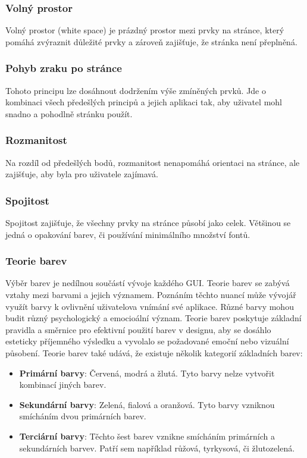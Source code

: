 \subsubsection*{Volný prostor}
Volný prostor (white space) je prázdný prostor mezi prvky na stránce, který pomáhá zvýraznit důležité prvky a zároveň zajišťuje, že stránka není přeplněná.

\subsubsection*{Pohyb zraku po stránce}
Tohoto principu lze dosáhnout dodržením výše zmíněných prvků. Jde o kombinaci všech předešlých principů a jejich aplikaci tak, aby uživatel mohl snadno a pohodlně stránku použít.

\subsubsection*{Rozmanitost}
Na rozdíl od předešlých bodů, rozmanitost nenapomáhá orientaci na stránce, ale zajišťuje, aby byla pro uživatele zajímavá.

\subsubsection*{Spojitost}
Spojitost zajišťuje, že všechny prvky na stránce působí jako celek. Většinou se jedná o opakování barev, či používání minimálního množství fontů.

\subsubsection{Teorie barev}
Výběr barev je nedílnou součástí vývoje každého GUI. Teorie barev se zabývá vztahy mezi barvami a jejich významem. Poznáním těchto nuancí může vývojář využít barvy k ovlivnění uživatelova vnímání své aplikace. Různé barvy mohou budit různý psychologický a emocioální význam. Teorie barev poskytuje základní pravidla a směrnice pro efektivní použití barev v designu, aby se dosáhlo esteticky příjemného výsledku a vyvolalo se požadované emoční nebo vizuální působení. Teorie barev také udává, že existuje několik kategorií základních barev:
\begin{itemize}
    \item \textbf{Primární barvy}: Červená, modrá a žlutá. Tyto barvy nelze vytvořit kombinací jiných barev.
    \item \textbf{Sekundární barvy}: Zelená, fialová a oranžová. Tyto barvy vzniknou smícháním dvou primárních barev.
    \item \textbf{Terciární barvy}: Těchto šest barev vznikne smícháním primárních a sekundárních barvev. Patří sem například růžová, tyrkysová, či žlutozelená.
\end{itemize}

